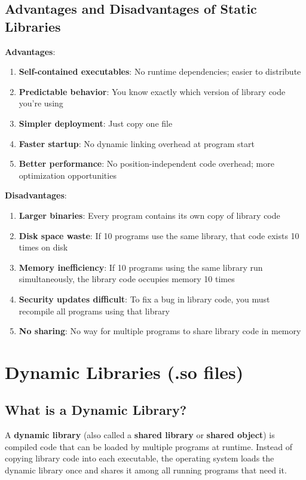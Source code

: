 \subsection{Advantages and Disadvantages of Static Libraries}

\textbf{Advantages}:
\begin{enumerate}
    \item \textbf{Self-contained executables}: No runtime dependencies; easier to distribute
    \item \textbf{Predictable behavior}: You know exactly which version of library code you're using
    \item \textbf{Simpler deployment}: Just copy one file
    \item \textbf{Faster startup}: No dynamic linking overhead at program start
    \item \textbf{Better performance}: No position-independent code overhead; more optimization opportunities
\end{enumerate}

\textbf{Disadvantages}:
\begin{enumerate}
    \item \textbf{Larger binaries}: Every program contains its own copy of library code
    \item \textbf{Disk space waste}: If 10 programs use the same library, that code exists 10 times on disk
    \item \textbf{Memory inefficiency}: If 10 programs using the same library run simultaneously, the library code occupies memory 10 times
    \item \textbf{Security updates difficult}: To fix a bug in library code, you must recompile all programs using that library
    \item \textbf{No sharing}: No way for multiple programs to share library code in memory
\end{enumerate}

\section{Dynamic Libraries (.so files)}

\subsection{What is a Dynamic Library?}

A \textbf{dynamic library} (also called a \textbf{shared library} or \textbf{shared object}) is compiled code that can be loaded by multiple programs at runtime. Instead of copying library code into each executable, the operating system loads the dynamic library once and shares it among all running programs that need it.

